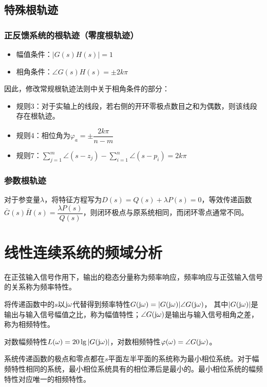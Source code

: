 \documentclass[11pt,a4paper]{ctexart}
\renewcommand{\j}{{\rm j}}
\begin{document}
    \subsection{特殊根轨迹}
        \subsubsection{正反馈系统的根轨迹（零度根轨迹）}
            \begin{itemize}
                \item 幅值条件：$|G(s)H(s)|=1$
                \item 相角条件：$\angle G(s)H(s)=\pm2k\pi$
            \end{itemize}

            因此，修改常规根轨迹法则中关于相角条件的部分：

            \begin{itemize}
                \item 规则3：对于实轴上的线段，若右侧的开环零极点数目之和为偶数，则该线段存在根轨迹。
                \item 规则4：相位角为$\varphi_a=\pm\dfrac{2k\pi}{n-m}$
                \item 规则7：$\sum\limits_{j=1}^m\angle (s-z_j)-\sum\limits_{i=1}^n\angle(s-p_i)=2k\pi$
            \end{itemize}
        \subsubsection{参数根轨迹}
            对于参变量$\lambda$，将特征方程写为$D(s)=Q(s)+\lambda P(s)=0$，等效传递函数$\bar G(s)\bar H(s)=\dfrac{\lambda P(s)}{Q(s)}$，则闭环极点与原系统相同，而闭环零点通常不同。
\newpage
\section{线性连续系统的频域分析}
    在正弦输入信号作用下，输出的稳态分量称为频率响应，频率响应与正弦输入信号的关系称为频率特性。

    将传递函数中的$s$以$\j\omega$代替得到频率特性$G(\j\omega)=|G(\j\omega)|\angle G(\j\omega)$，
    其中$|G(\j\omega)|$是输出与输入信号幅值之比，称为幅值特性；$\angle G(\j\omega)$是输出与输入信号相角之差，称为相频特性。

    对数幅频特性$L(\omega)=20\lg|G(\j\omega)|$，对数相频特性$\varphi(\omega)=\angle G(\j\omega)$。

    系统传递函数的极点和零点都在$s$平面左半平面的系统称为最小相位系统。对于幅频特性相同的系统，最小相位系统具有的相位滞后是最小的。最小相位系统的幅频特性对应唯一的相频特性。
\end{document}

